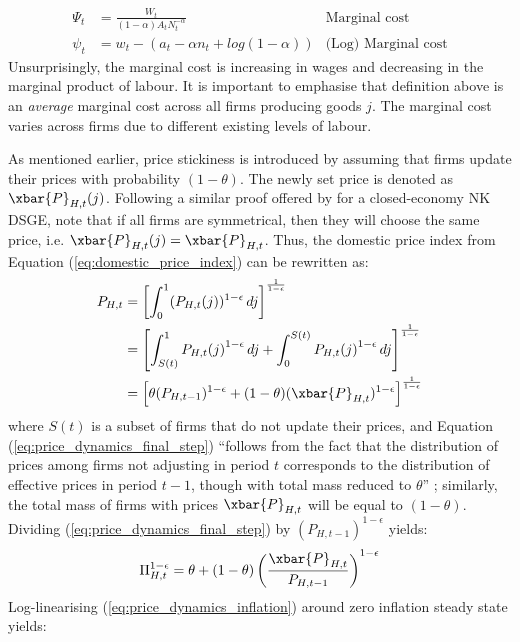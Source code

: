\begin{align}
 \Psi_t &= \frac{W_t}{(1-\alpha)A_t N_t^{-\alpha}} & \text{Marginal cost}\\
 \psi_t &= w_t - (a_t - \alpha n_t + log(1-\alpha)) & \text{(Log) Marginal cost} \label{eq:log_average_marginal_cost}
\end{align}
Unsurprisingly, the marginal cost is increasing in wages and decreasing in the marginal product of labour. It is important to emphasise that definition above is an \textit{average} marginal cost across all firms producing goods $j$. The marginal cost varies across firms due to different existing levels of labour. 

As mentioned earlier, price stickiness is introduced by assuming that firms update their prices with probability $(1-\theta)$. The newly set price is denoted as $\xbar{P}_{H,t}(j)$. Following a similar proof offered by \textcite{jordigal_2015_monetary} for a closed-economy NK DSGE, note that if all firms are symmetrical, then they will choose the same price, i.e. $\xbar{P}_{H,t}(j) = \xbar{P}_{H,t}$. Thus, the domestic price index from Equation (\ref{eq:domestic_price_index}) can be rewritten as:
\begin{align}
 P_{H,t} &= \left[ \int_{0}^{1} (P_{H,t}(j))^{1-\epsilon} \, dj\right]^{\frac{1}{1-\epsilon}} \\
 &= \left[ \int_{S(t)}^{1} {P_{H,t}(j)}^{1-\epsilon} \, dj + \int_{0}^{S(t)}{P_{H,t}(j)}^{1-\epsilon} \, dj\right]^{\frac{1}{1-\epsilon}} \\
 &= \left[ \theta (P_{H,t-1})^{1-\epsilon} + (1-\theta)(\xbar{P}_{H,t})^{1-\epsilon} \right]^{\frac{1}{1-\epsilon}} \label{eq:price_dynamics_final_step}
\end{align}
where $S(t)$ is a subset of firms that do not update their prices, and Equation (\ref{eq:price_dynamics_final_step}) ``follows from the fact that the distribution of prices among firms not adjusting in period $t$ corresponds to the distribution of effective prices in period $t-1$, though with total mass reduced to $\theta$'' \parencite[84]{jordigal_2015_monetary}; similarly, the total mass of firms with prices $\xbar{P}_{H,t}$ will be equal to $(1-\theta)$. Dividing (\ref{eq:price_dynamics_final_step}) by $(P_{H,t-1})^{1-\epsilon}$ yields:
\begin{equation}
 \Pi_{H,t}^{1-\epsilon} = \theta + (1-\theta)\left(\frac{\xbar{P}_{H,t}}{P_{H,t-1}}\right)^{1-\epsilon} \label{eq:price_dynamics_inflation}
\end{equation}
Log-linearising (\ref{eq:price_dynamics_inflation}) around zero inflation steady state yields:
